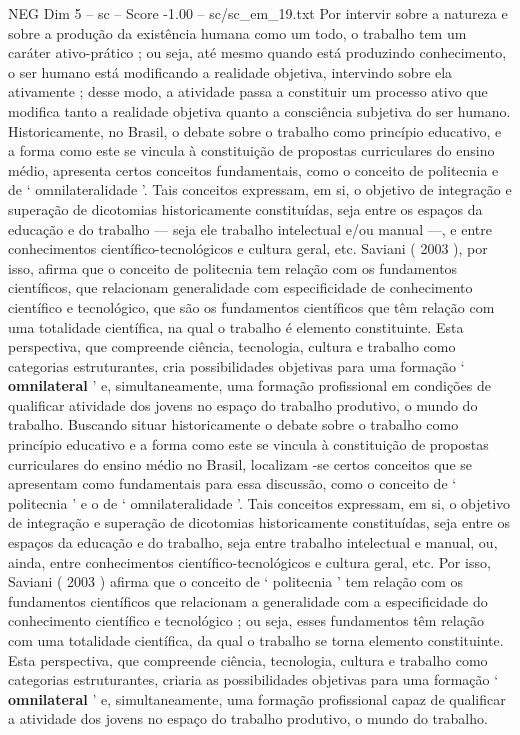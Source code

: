 \begin{textsample}{NEG Dim 5 – sc – Score -1.00 – sc/sc\_em\_19.txt}
Por intervir sobre a natureza e sobre a produção da existência humana como um todo, o trabalho tem um caráter ativo-prático ; ou seja, até mesmo quando está produzindo conhecimento, o ser humano está modificando a realidade objetiva, intervindo sobre ela ativamente ; desse modo, a atividade passa a constituir um processo ativo que modifica tanto a realidade objetiva quanto a consciência subjetiva do ser humano.
Historicamente, no Brasil, o debate sobre o trabalho como princípio educativo, e a forma como este se vincula à constituição de propostas curriculares do ensino médio, apresenta certos conceitos fundamentais, como o conceito de politecnia e de ‘ omnilateralidade ’.
Tais conceitos expressam, em si, o objetivo de integração e superação de dicotomias historicamente constituídas, seja entre os espaços da educação e do trabalho — seja ele trabalho intelectual e/ou manual —, e entre conhecimentos científico-tecnológicos e cultura geral, etc.
Saviani ( 2003 ), por isso, afirma que o conceito de politecnia tem relação com os fundamentos científicos, que relacionam generalidade com especificidade de conhecimento científico e tecnológico, que são os fundamentos científicos que têm relação com uma totalidade científica, na qual o trabalho é elemento constituinte.
Esta perspectiva, que compreende ciência, tecnologia, cultura e trabalho como categorias estruturantes, cria possibilidades objetivas para uma formação ‘ \textbf{omnilateral} ’ e, simultaneamente, uma formação profissional em condições de qualificar atividade dos jovens no espaço do trabalho produtivo, o mundo do trabalho.
Buscando situar historicamente o debate sobre o trabalho como princípio educativo e a forma como este se vincula à constituição de propostas curriculares do ensino médio no Brasil, localizam -se certos conceitos que se apresentam como fundamentais para essa discussão, como o conceito de ‘ politecnia ’ e o de ‘ omnilateralidade ’.
Tais conceitos expressam, em si, o objetivo de integração e superação de dicotomias historicamente constituídas, seja entre os espaços da educação e do trabalho, seja entre trabalho intelectual e manual, ou, ainda, entre conhecimentos científico-tecnológicos e cultura geral, etc.
Por isso, Saviani ( 2003 ) afirma que o conceito de ‘ politecnia ’ tem relação com os fundamentos científicos que relacionam a generalidade com a especificidade do conhecimento científico e tecnológico ; ou seja, esses fundamentos têm relação com uma totalidade científica, da qual o trabalho se torna elemento constituinte.
Esta perspectiva, que compreende ciência, tecnologia, cultura e trabalho como categorias estruturantes, criaria as possibilidades objetivas para uma formação ‘ \textbf{omnilateral} ’ e, simultaneamente, uma formação profissional capaz de qualificar a atividade dos jovens no espaço do trabalho produtivo, o mundo do trabalho.

\end{textsample}
